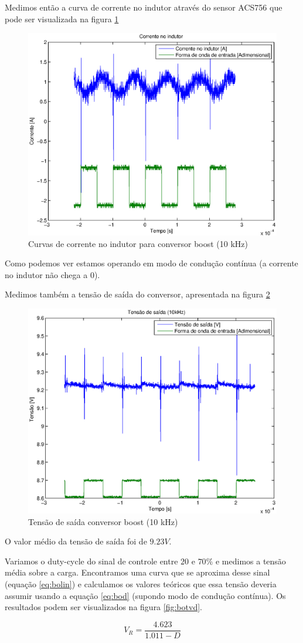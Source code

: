 \documentclass{article}
\begin{document}
Medimos então a curva de corrente no indutor através do sensor ACS756 que pode ser visualizada na figura \ref{fig:boil}
\begin{figure}[H]
	\centering
	\includegraphics[width=0.5\linewidth]{Dados/boost/il}
	\caption{Curvas de corrente no indutor para conversor boost (10 kHz)}
	\label{fig:boil}
\end{figure}
Como podemos ver estamos operando em modo de condução contínua (a corrente no indutor não chega a 0).

Medimos também a tensão de saída do conversor, apresentada na figura \ref{fig:bot10k}
\begin{figure}[H]
	\centering
	\includegraphics[width=0.5\linewidth]{Dados/boost/t10k}
	\caption{Tensão de saída conversor boost (10 kHz)}
	\label{fig:bot10k}
\end{figure}

O valor médio da tensão de saída foi de $9.23 V$.

Variamos o duty-cycle do sinal de controle entre $20$ e $70\%$ e medimos a tensão média sobre a carga. Encontramos uma curva que se aproxima desse sinal (equação \ref{eq:bolin}) e calculamos os valores teóricos que essa tensão deveria assumir usando a equação \ref{eq:bod} (supondo modo de condução contínua). Os resultados podem ser visualizados na figura \ref{fig:botvd}.

\begin{capequ}[H]
	\begin{equation}
	V_R = \frac{4.623}{1.011 - D}	
	\end{equation}
	\caption{Curva que aproxima a tensão medida de saída em função do duty-cycle}
	\label{eq:bolin}
\end{capequ}
\end{document}
